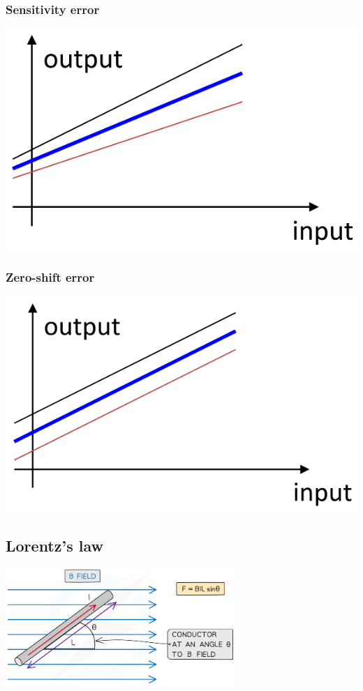 \documentclass[11pt]{article}
\begin{document}
\subsubsection{Sensitivity error}
\label{sec:orgc41435b}
\begin{center}
\includegraphics[width=.9\linewidth]{./images/instrument-error-sensitivity-error.png}
\end{center}
\subsubsection{Zero-shift error}
\label{sec:org4a2c988}
\begin{center}
\includegraphics[width=.9\linewidth]{./images/instrument-error-zero-shift-error.png}
\end{center}
\subsection{Lorentz's law}
\label{sec:org368999d}
\begin{center}
\includegraphics[height=12em]{./images/lorentz-law-diagram.png}
\end{center}
\end{document}
